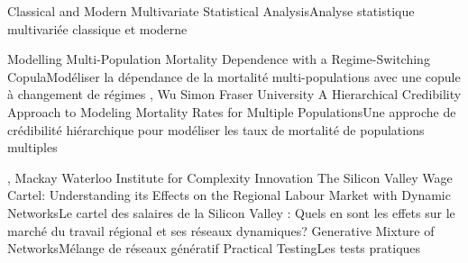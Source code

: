 \sessionDay{\Tuesday}


{
}
{Classical and Modern Multivariate Statistical Analysis}{Analyse statistique multivariée classique et moderne}
{\bubbleE \enspace \screenB}


{
}
{Modelling Multi-Population Mortality Dependence with a Regime-Switching Copula}{Modéliser la dépendance de la mortalité multi-populations avec une copule à changement de régimes}
{\bubbleE \enspace \screenE}
{
,  {Wu}
{Simon Fraser University}
}
{A Hierarchical Credibility Approach to Modeling Mortality Rates for Multiple Populations}{Une approche de crédibilité hiérarchique pour modéliser les taux de mortalité de populations multiples}
{\bubbleE \enspace \screenE}


{
,  {Mackay}
{Waterloo Institute for Complexity Innovation}
}
{The Silicon Valley Wage Cartel: Understanding its Effects on the Regional Labour Market with Dynamic Networks}{Le cartel des salaires de la Silicon Valley : Quels en sont les effets sur le marché du travail régional et ses réseaux dynamiques?}
{\bubbleE \enspace \screenE}
{
}
{Generative Mixture of Networks}{Mélange de réseaux génératif}
{\bubbleE \enspace \screenE}
{
}
{Practical Testing}{Les tests pratiques }
{\bubbleE \enspace \screenE}


